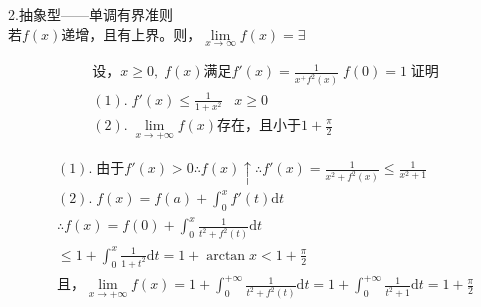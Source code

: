 \documentclass[cn,cyan,fleqn]{elegantbook}
\begin{document}
\textcolor{third}{2.抽象型——单调有界准则}\\
\mbox{若}$\displaystyle f(x)$\mbox{递增，且有上界。则，}$\displaystyle \lim\limits_{x\to \infty}f(x)=\exists$
\begin{problem}
\begin{equation*}
  \begin{aligned}
  &\mbox{设，}x\geqslant 0, \; f(x) \mbox{满足}f'(x)=\frac{1}{x^+f^2(x)} \; f(0)=1 \;\mbox{证明}\\
  &(1).\;f'(x)\leqslant\frac{1}{1+x^2}\;\;\;x\geqslant 0\\
  &(2).\;\lim\limits_{x\to +\infty}f(x)\mbox{存在，且小于}1+\frac{\pi}{2}
  \end{aligned}
\end{equation*}
\end{problem}
\begin{solution}
\begin{equation*}
  \begin{aligned}
  &(1). \;\mbox{由于}f'(x)>0 \therefore f(x)\uparrow \therefore f'(x)=\frac{1}{x^2+f^2(x)} \leqslant \frac{1}{x^2+1}\\
  &(2). \;f(x)=f(a)+\int_{0}^{x}f'(t)\text{d}t\\
  &\therefore f(x)=f(0)+\int_{0}^{x}\frac{1}{t^2+f^2(t)}\text{d}t\\
  &\leqslant 1+\int_{0}^{x}\frac{1}{1+t^2}\text{d}t=1+\arctan x<1+\frac{\pi}{2}\\
  &\mbox{且，}\lim\limits_{x\to +\infty}f(x)=1+\int_{0}^{+\infty}\frac{1}{t^2+f^2(t)}\text{d}t=1+\int_{0}^{+\infty}\frac{1}{t^2+1}\text{d}t=1+\frac{\pi}{2}
  \end{aligned}
\end{equation*}
\end{solution}
\end{document}
